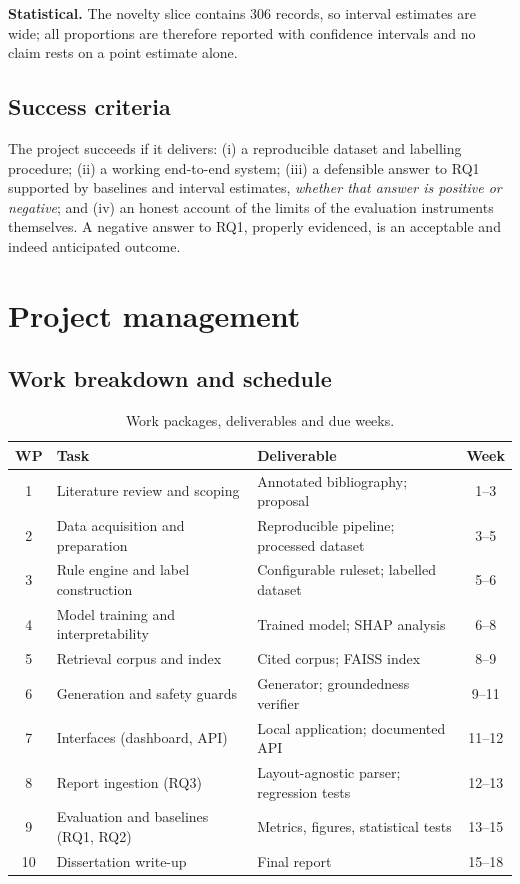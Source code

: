\documentclass[11pt,a4paper]{article}
\begin{document}
\textbf{Statistical.} The novelty slice contains 306 records, so interval estimates
are wide; all proportions are therefore reported with confidence intervals and no
claim rests on a point estimate alone.

\subsection{Success criteria}

The project succeeds if it delivers: (i) a reproducible dataset and labelling
procedure; (ii) a working end-to-end system; (iii) a defensible answer to RQ1
supported by baselines and interval estimates, \emph{whether that answer is
positive or negative}; and (iv) an honest account of the limits of the evaluation
instruments themselves. A negative answer to RQ1, properly evidenced, is an
acceptable and indeed anticipated outcome.

\section{Project management}

\subsection{Work breakdown and schedule}

\begin{table}[h!]
\centering
\caption{Work packages, deliverables and due weeks.\label{tab:wp}}
\renewcommand{\arraystretch}{1.1}
\setlength{\tabcolsep}{4pt}
\begin{tabular}{|c|p{5.0cm}|p{6.6cm}|c|}
\hline
\textbf{WP} & \textbf{Task} & \textbf{Deliverable} & \textbf{Week} \\
\hline
1 & Literature review and scoping & Annotated bibliography; proposal & 1--3 \\
2 & Data acquisition and preparation & Reproducible pipeline; processed dataset & 3--5 \\
3 & Rule engine and label construction & Configurable ruleset; labelled dataset & 5--6 \\
4 & Model training and interpretability & Trained model; SHAP analysis & 6--8 \\
5 & Retrieval corpus and index & Cited corpus; FAISS index & 8--9 \\
6 & Generation and safety guards & Generator; groundedness verifier & 9--11 \\
7 & Interfaces (dashboard, API) & Local application; documented API & 11--12 \\
8 & Report ingestion (RQ3) & Layout-agnostic parser; regression tests & 12--13 \\
9 & Evaluation and baselines (RQ1, RQ2) & Metrics, figures, statistical tests & 13--15 \\
10 & Dissertation write-up & Final report & 15--18 \\
\hline
\end{tabular}
\end{table}
\end{document}
